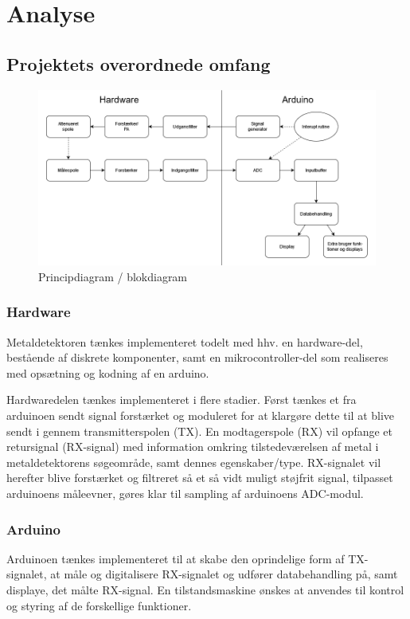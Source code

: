 \documentclass[../main.tex]{subfiles}
\begin{document}
\chapter{Analyse} \label{Chap:Analyse}

\section{Projektets overordnede omfang}

    \begin{figure}[H]
      \includegraphics[width=\textwidth]{Pictures/Diagrammer/Overordnet projektdiagram 1.png}
     \caption{Principdiagram / blokdiagram}
     \label{fig: Principdiagram/blokdiagram}
     \end{figure}

\subsection{Hardware}
Metaldetektoren tænkes implementeret todelt med hhv. en hardware-del, bestående af diskrete komponenter, samt en mikrocontroller-del som realiseres med opsætning og kodning af en arduino.\par
Hardwaredelen tænkes implementeret i flere stadier. Først tænkes et fra arduinoen sendt signal forstærket og moduleret for at klargøre dette til at blive sendt i gennem transmitterspolen (TX).
En modtagerspole (RX) vil opfange et retursignal (RX-signal) med information omkring tilstedeværelsen af metal i metaldetektorens søgeområde, samt dennes egenskaber/type.
RX-signalet vil herefter blive forstærket og filtreret så et så vidt muligt støjfrit signal, tilpasset arduinoens måleevner, gøres klar til sampling af arduinoens ADC-modul.
\newpage
\subsection{Arduino}
Arduinoen tænkes implementeret til at skabe den oprindelige form af TX-signalet, at måle og digitalisere RX-signalet og udfører databehandling på, samt displaye, det målte RX-signal.
En tilstandsmaskine ønskes at anvendes til kontrol og styring af de forskellige funktioner.
\end{document}

